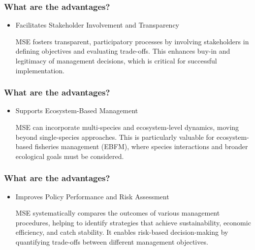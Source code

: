 \documentclass{beamer}
\begin{document}
\begin{frame}
	\frametitle{What are the advantages?}
	
	\begin{itemize}
		\item Facilitates Stakeholder Involvement and Transparency \\ 
		
		\bigskip
		
		MSE fosters transparent, participatory processes by involving stakeholders in defining objectives and evaluating trade-offs. This enhances buy-in and legitimacy of management decisions, which is critical for successful implementation.
	\end{itemize}
	
\end{frame}

\begin{frame}
	\frametitle{What are the advantages?}
	
	\begin{itemize}
		\item Supports Ecosystem-Based Management \\ 
		
		\bigskip
		
		MSE can incorporate multi-species and ecosystem-level dynamics, moving beyond single-species approaches. This is particularly valuable for ecosystem-based fisheries management (EBFM), where species interactions and broader ecological goals must be considered.
	\end{itemize}
	
\end{frame}

\begin{frame}
	\frametitle{What are the advantages?}
	
	\begin{itemize}
		\item Improves Policy Performance and Risk Assessment \\ 
		
		\bigskip
		
		MSE systematically compares the outcomes of various management procedures, helping to identify strategies that achieve sustainability, economic efficiency, and catch stability. It enables risk-based decision-making by quantifying trade-offs between different management objectives.
	\end{itemize}
	
\end{frame}
\end{document}
